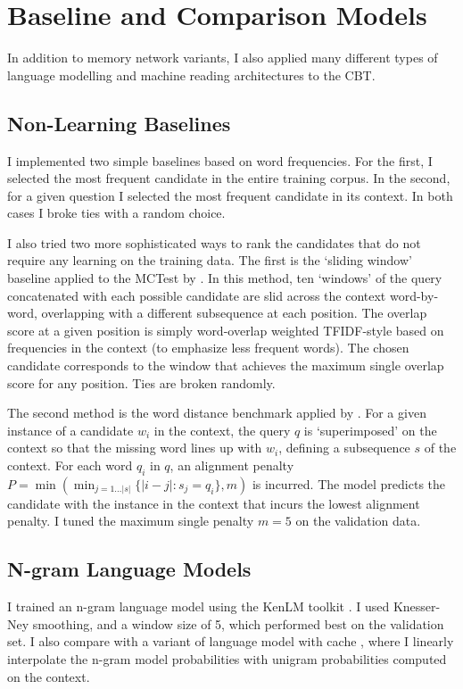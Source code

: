 \section{Baseline and Comparison Models}


In addition to memory network variants, I also applied many different types of
 language modelling and machine reading architectures to the CBT.

\subsection{Non-Learning Baselines}
I implemented two simple baselines based on word frequencies. For the first, I selected the most frequent candidate in the entire training corpus. In the second, for a given question I selected the most frequent candidate in its context. In both cases I broke ties with a random choice. 

I also tried two more sophisticated ways to rank the candidates that do not require any learning on the training data. The first is the `sliding window' baseline applied to the MCTest by \cite{richardson2013mctest}. In this method, ten `windows' of the query concatenated with each possible candidate are slid across the context word-by-word, overlapping with a different subsequence at each position. The overlap score at a given position is simply word-overlap weighted TFIDF-style based on frequencies in the context (to emphasize less frequent words). The chosen candidate corresponds to the window that achieves the maximum single overlap score for any position. Ties are broken randomly. 

The second method is the word distance benchmark applied by \cite{nips15_hermann}. For a given instance of a candidate \(w_i\) in the context, the query \(q\) is `superimposed' on the context so that the missing word lines up with \(w_i\), defining a subsequence \(s\) of the context. For each word \(q_i\) in \(q\), an alignment penalty $P = \min( \min_{j = 1 \dots |s|} \{|i - j| : s_j = q_i\}, m)$ is incurred. The model predicts the candidate with the instance in the context that incurs the lowest alignment penalty. I tuned the maximum single penalty \(m=5\)  on the validation data.  

\subsection{N-gram Language Models}
I trained an n-gram language model using the KenLM toolkit \citep{Heafield-estimate}. I used Knesser-Ney smoothing, and a window size of 5, which performed best on the validation set.
%
I also compare with a variant of language model with cache \citep{kuhn1990cache}, where I linearly interpolate the n-gram model probabilities with unigram probabilities computed on the context.

